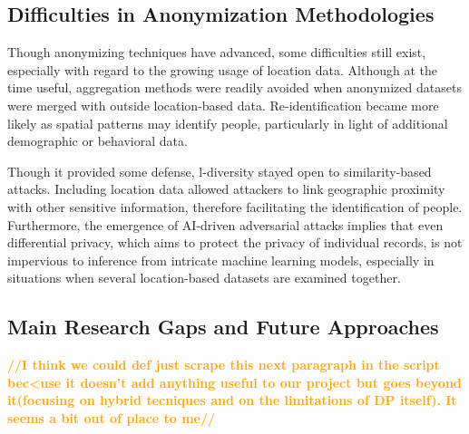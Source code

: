 \documentclass[twocolumn]{article}
\newcommand{\later}[1]{\textbf{\textcolor{orange}{#1}}}
\begin{document}
\subsection{Difficulties in Anonymization Methodologies}

Though anonymizing techniques have advanced, some difficulties still exist, especially with regard to the growing usage of location data. Although at the time useful, aggregation methods were readily avoided when anonymized datasets were merged with outside location-based data. Re-identification became more likely as spatial patterns may identify people, particularly in light of additional demographic or behavioral data.

Though it provided some defense, l-diversity stayed open to similarity-based attacks. Including location data allowed attackers to link geographic proximity with other sensitive information, therefore facilitating the identification of people. Furthermore, the emergence of AI-driven adversarial attacks implies that even differential privacy, which aims to protect the privacy of individual records, is not impervious to inference from intricate machine learning models, especially in situations when several location-based datasets are examined together.

\subsection{Main Research Gaps and Future Approaches}
\later{//I think we could def just scrape this  next paragraph in the script bec<use it doesn't add anything useful to our project but goes beyond it(focusing on hybrid tecniques and on the limitations of DP itself). It seems a bit out of place to me//}


\end{document}
